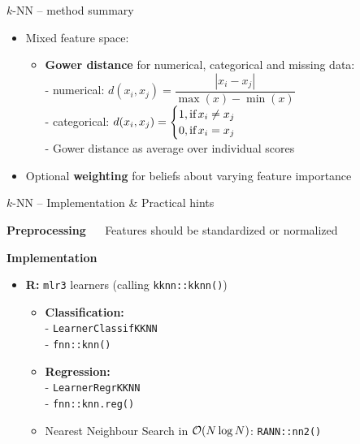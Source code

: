\documentclass[11pt,compress,t,notes=noshow, xcolor=table]{beamer}
\newcommand{\highlight}[1]{\textcolor{hlcol}{\textbf{#1}}}
\begin{document}
\begin{frame2}{$k$-NN -- method summary}
\begin{itemize}
  \item Mixed feature space: 
  \begin{itemize}
      \item \textbf{Gower distance} for numerical, categorical and missing data:\\ %
            - numerical: $d(x_i,x_j) =  \dfrac{|x_i-x_j|}{\max(x)-\min(x)}$\\
            - categorical: $d(x_i,x_j) =
            \begin{cases}
              1, \text{if\,} x_i \neq x_j\\
              0, \text{if\,} x_i = x_j
            \end{cases}$\\
            - Gower distance as average over individual scores
  \end{itemize}
  \item Optional \textbf{weighting} for beliefs about varying feature
  importance
\end{itemize}
\vfill
  

\end{frame2}

\begin{frame2}{$k$-NN -- Implementation \& Practical hints}
  \footnotesize

\highlight{Preprocessing} ~~
Features should be standardized or normalized

\medskip

\highlight{Implementation}
\begin{itemize}
  \item \textbf{R:} \texttt{mlr3} learners (calling \texttt{kknn::kknn()})
  \begin{itemize}
    \item \textbf{Classification:}\\ 
    - \texttt{LearnerClassifKKNN}\\
    - \texttt{fnn::knn()}
    \item \textbf{Regression:}\\
    - \texttt{LearnerRegrKKNN}\\
    - \texttt{fnn::knn.reg()}
    \item Nearest Neighbour Search in $\mathcal{O}(N \log N)$: \texttt{RANN::nn2()}
  \end{itemize}
\end{itemize}
\end{frame2}
\end{document}
